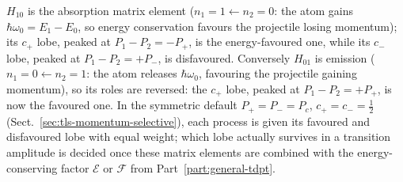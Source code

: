 $H_{10}$ is the absorption matrix element ($n_1=1\leftarrow n_2=0$: the atom gains $\hbar\omega_0=E_1-E_0$, so energy conservation favours the projectile losing momentum); its $c_+$ lobe, peaked at $P_1-P_2=-P_+$, is the energy-favoured one, while its $c_-$ lobe, peaked at $P_1-P_2=+P_-$, is disfavoured. Conversely $H_{01}$ is emission ($n_1=0\leftarrow n_2=1$: the atom releases $\hbar\omega_0$, favouring the projectile gaining momentum), so its roles are reversed: the $c_+$ lobe, peaked at $P_1-P_2=+P_+$, is now the favoured one. In the symmetric default $P_+=P_-=P_c$, $c_+=c_-=\frac12$ (Sect.~\ref{sec:tls-momentum-selective}), each process is given its favoured and disfavoured lobe with equal weight; which lobe actually survives in a transition amplitude is decided once these matrix elements are combined with the energy-conserving factor $\mathcal E$ or $\mathcal F$ from Part~\ref{part:general-tdpt}.